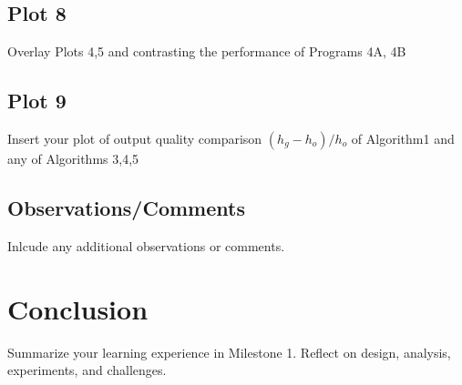 \documentclass{article}
\begin{document}
\subsection{Plot 8}
{\color{red} Overlay Plots 4,5 and contrasting the performance of Programs 4A, 4B}

\subsection{Plot 9}
{\color{red} Insert your plot of output quality comparison $(h_g - h_o)/h_o$ of Algorithm1 and any of Algorithms 3,4,5}

\subsection{Observations/Comments}
{\color{red} Inlcude any additional observations or comments.}

\section{Conclusion}
{\color{red} Summarize your learning experience in Milestone 1. Reflect on design, analysis, experiments, and challenges.}
\end{document}
